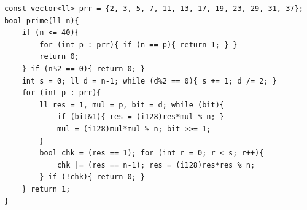 \begin{verbatim}
const vector<ll> prr = {2, 3, 5, 7, 11, 13, 17, 19, 23, 29, 31, 37};
bool prime(ll n){
	if (n <= 40){
		for (int p : prr){ if (n == p){ return 1; } }
		return 0;
	} if (n%2 == 0){ return 0; }
	int s = 0; ll d = n-1; while (d%2 == 0){ s += 1; d /= 2; }
	for (int p : prr){
		ll res = 1, mul = p, bit = d; while (bit){
			if (bit&1){ res = (i128)res*mul % n; }
			mul = (i128)mul*mul % n; bit >>= 1;
		}
		bool chk = (res == 1); for (int r = 0; r < s; r++){
			chk |= (res == n-1); res = (i128)res*res % n;
		} if (!chk){ return 0; }
	} return 1;
}
\end{verbatim}